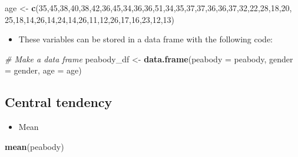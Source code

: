 \documentclass[
]{book}
\newenvironment{Shaded}{\begin{snugshade}}{\end{snugshade}}
\newcommand{\AttributeTok}[1]{\textcolor[rgb]{0.13,0.29,0.53}{#1}}
\newcommand{\CommentTok}[1]{\textcolor[rgb]{0.56,0.35,0.01}{\textit{#1}}}
\newcommand{\DecValTok}[1]{\textcolor[rgb]{0.00,0.00,0.81}{#1}}
\newcommand{\FunctionTok}[1]{\textcolor[rgb]{0.13,0.29,0.53}{\textbf{#1}}}
\newcommand{\NormalTok}[1]{#1}
\newcommand{\OtherTok}[1]{\textcolor[rgb]{0.56,0.35,0.01}{#1}}
\providecommand{\tightlist}{%
  \setlength{\itemsep}{0pt}\setlength{\parskip}{0pt}}
\begin{document}
\begin{Shaded}
\begin{Highlighting}[]
\NormalTok{age }\OtherTok{\textless{}{-}} \FunctionTok{c}\NormalTok{(}\DecValTok{35}\NormalTok{,}\DecValTok{45}\NormalTok{,}\DecValTok{38}\NormalTok{,}\DecValTok{40}\NormalTok{,}\DecValTok{38}\NormalTok{,}\DecValTok{42}\NormalTok{,}\DecValTok{36}\NormalTok{,}\DecValTok{45}\NormalTok{,}\DecValTok{34}\NormalTok{,}\DecValTok{36}\NormalTok{,}\DecValTok{36}\NormalTok{,}\DecValTok{51}\NormalTok{,}\DecValTok{34}\NormalTok{,}\DecValTok{35}\NormalTok{,}\DecValTok{37}\NormalTok{,}\DecValTok{37}\NormalTok{,}\DecValTok{36}\NormalTok{,}\DecValTok{36}\NormalTok{,}\DecValTok{37}\NormalTok{,}\DecValTok{32}\NormalTok{,}\DecValTok{22}\NormalTok{,}\DecValTok{28}\NormalTok{,}\DecValTok{18}\NormalTok{,}\DecValTok{20}\NormalTok{,}
         \DecValTok{25}\NormalTok{,}\DecValTok{18}\NormalTok{,}\DecValTok{14}\NormalTok{,}\DecValTok{26}\NormalTok{,}\DecValTok{14}\NormalTok{,}\DecValTok{24}\NormalTok{,}\DecValTok{14}\NormalTok{,}\DecValTok{26}\NormalTok{,}\DecValTok{11}\NormalTok{,}\DecValTok{12}\NormalTok{,}\DecValTok{26}\NormalTok{,}\DecValTok{17}\NormalTok{,}\DecValTok{16}\NormalTok{,}\DecValTok{23}\NormalTok{,}\DecValTok{12}\NormalTok{,}\DecValTok{13}\NormalTok{)}
\end{Highlighting}
\end{Shaded}

\begin{itemize}
\tightlist
\item
  These variables can be stored in a data frame with the following code:
\end{itemize}

\begin{Shaded}
\begin{Highlighting}[]
\CommentTok{\# Make a data frame}
\NormalTok{peabody\_df }\OtherTok{\textless{}{-}} \FunctionTok{data.frame}\NormalTok{(}\AttributeTok{peabody =}\NormalTok{ peabody, }\AttributeTok{gender =}\NormalTok{ gender, }\AttributeTok{age =}\NormalTok{ age)}
\end{Highlighting}
\end{Shaded}

\subsection{Central tendency}\label{central-tendency}

\begin{itemize}
\tightlist
\item
  Mean
\end{itemize}

\begin{Shaded}
\begin{Highlighting}[]
\FunctionTok{mean}\NormalTok{(peabody)}
\end{Highlighting}
\end{Shaded}
\end{document}

